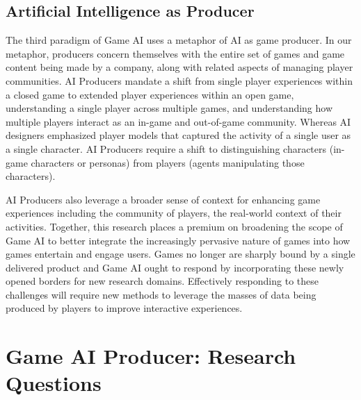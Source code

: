 \documentclass[conference]{IEEEtran}
\newcommand{\mytodo}[1]{\textbf{[[#1]]}}
\begin{document}
\subsection{Artificial Intelligence as Producer}

The third paradigm of Game AI uses a metaphor of AI as game producer. 
In our metaphor, producers concern themselves with the entire set of games and game content being made by a company, along with related aspects of managing player communities. 
AI Producers mandate a shift from single player experiences within a closed game to extended player experiences within an open game, understanding a single player across multiple games, and understanding how multiple players interact as an in-game and out-of-game community. 
Whereas AI designers emphasized player models that captured the activity of a single user as a single character. AI Producers require a shift to distinguishing characters (in-game characters or personas) from players (agents manipulating those characters). 

AI Producers also leverage a broader sense of context for enhancing game experiences including the community of players, the real-world context of their activities.
Together, this research places a premium on broadening the scope of Game AI to better integrate the increasingly pervasive nature of games into how games entertain and engage users. Games no longer are sharply bound by a single delivered product and Game AI ought to respond by incorporating these newly opened borders for new research domains. Effectively responding to these challenges will require new methods to leverage the masses of data being produced by players to improve interactive experiences.



\section{Game AI Producer: Research Questions}
\end{document}
